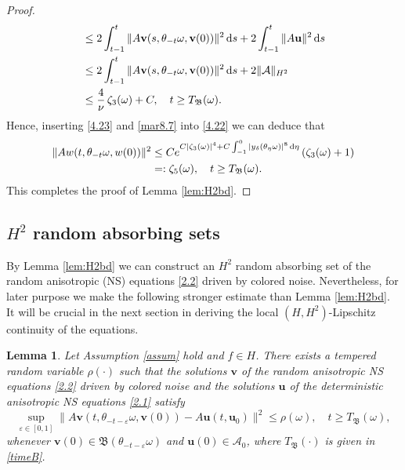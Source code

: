 \documentclass{elsarticle}
\newtheorem{lemma}[theorem]{Lemma}
\theoremstyle{definition}
\numberwithin{equation}{section}
\renewcommand{\d}{{\rm{d}}}
\begin{document}
\begin{proof}
\begin{align}
&\leq2\int_{t-1}^t\|A\textbf{v}(s,\theta_{-t}\omega,\textbf{v}(0))\|^2\, \d s+2\int_{t-1}^t\|A\textbf{u}\|^2\, \d s\nonumber\\
&\leq  2\int_{t-1}^t \|A\textbf{v}(s,\theta_{-t}\omega,\textbf{v}(0))\|^2\, \d s  +  2\|\mathcal A \|_{H^2} \nonumber\\
&\leq \frac 4  \nu \, \zeta_3(\omega) +C ,  \quad t\geq T_{\mathfrak B}(\omega).  \label{mar8.7}
\end{align}
Hence, inserting \eqref{4.23} and \eqref{mar8.7} into \eqref{4.22} we can deduce that
\begin{align}
\|Aw(t,\theta_{-t}\omega,w(0))\|^2
&\leq C e^{C|\zeta_3(\omega) |^4 + C\int^0_{-1} |y_\delta(\theta_{\eta}\omega) |^8
\, \d \eta} \left(   \zeta_3(\omega) +1
\right)  \nonumber \\
&=:\zeta_5(\omega),  \quad t\geq T_{\mathfrak B}(\omega).  \nonumber
\end{align}
 This completes the proof of Lemma \ref{lem:H2bd}.
\end{proof}


\subsection{$H^2$ random absorbing sets}
By Lemma \ref{lem:H2bd} we can construct an $H^2$ random absorbing set of the  random anisotropic  (NS) equations \eqref{2.2} driven by colored noise. Nevertheless, for   later purpose we  make  the following  stronger estimate than Lemma \ref{lem:H2bd}.
It will be crucial in the next section in deriving the local $(H,H^2)$-Lipschitz continuity of the equations.
\begin{lemma}\label{lemma4.4}
 Let Assumption \ref{assum} hold and $f\in H$. There exists a tempered random variable $\rho(\cdot)$ such that  the solutions $\textbf{v}$ of the random anisotropic  NS equations \eqref{2.2} driven by colored noise and the solutions $\textbf{u}$ of the deterministic anisotropic  NS equations \eqref{2.1} satisfy
\[
  \sup_{\varepsilon\in [0,1]} \|A\textbf{v}(t,\theta_{-t-\varepsilon}\omega,  \textbf{v}(0))- A\textbf{u}(t,\textbf{u}_0)\|^2     \leq  \rho(\omega) ,\quad t\geq T_{\mathfrak B} (\omega),
\]
whenever $\textbf{v}(0)\in \mathfrak B(\theta_{-t-\varepsilon} \omega)$ and $\textbf{u}(0)\in \mathcal A_0$, where $T_{\mathfrak B} (\cdot)$ is given  in \eqref{timeB}.
\end{lemma}
\end{document}

